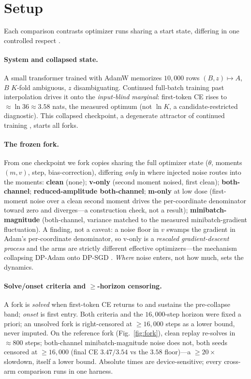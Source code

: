\section{Setup}
\label{sec:setup}

Each comparison contrasts optimizer runs sharing a start state, differing in one controlled respect \citep{position}.

\paragraph{System and collapsed state.}
A small transformer trained with AdamW \citep{adam} memorizes $10{,}000$ rows $(B,z)\!\mapsto\!A$, $B$ $K$-fold ambiguous, $z$ disambiguating. Continued full-batch training past interpolation drives it onto the \emph{input-blind marginal}: first-token CE rises to $\approx\ln36\approx3.58$ nats, the measured optimum (not $\ln K$, a candidate-restricted diagnostic). This collapsed checkpoint, a degenerate attractor of continued training \citep{stochcollapse}, starts all forks.

\paragraph{The frozen fork.}
From one checkpoint we fork copies sharing the full optimizer state ($\theta$, moments $(m,v)$, step, bias-correction), differing \emph{only} in where injected noise routes into the moments: \textbf{clean} (none); \textbf{v-only} (second moment noised, first clean); \textbf{both-channel}; \textbf{reduced-amplitude both-channel}; \textbf{m-only} at low dose (first-moment noise over a clean second moment drives the per-coordinate denominator toward zero and diverges---a construction check, not a result); \textbf{minibatch-magnitude} (both-channel, variance matched to the measured minibatch-gradient fluctuation). A finding, not a caveat: a noise floor in $v$ swamps the gradient in Adam's per-coordinate denominator, so v-only is a \emph{rescaled gradient-descent process} and the arms are strictly different effective optimizers---the mechanism collapsing DP-Adam onto DP-SGD \citep{dpadambc,litramer}. \emph{Where} noise enters, not how much, sets the dynamics.

\paragraph{Solve/onset criteria and $\ge$-horizon censoring.}
A fork is \emph{solved} when first-token CE returns to and sustains the pre-collapse band; \emph{onset} is first entry. Both criteria and the $16{,}000$-step horizon were fixed a priori; an unsolved fork is right-censored at $\ge16{,}000$ steps as a lower bound, never imputed. On the reference fork (Fig.~\ref{fig:fork}), clean replay re-solves in $\approx800$ steps; both-channel minibatch-magnitude noise does not, both seeds censored at $\ge16{,}000$ (final CE $3.47/3.54$ vs the $3.58$ floor)---a $\ge20\times$ slowdown, itself a lower bound. Absolute times are device-sensitive; every cross-arm comparison runs in one harness.

